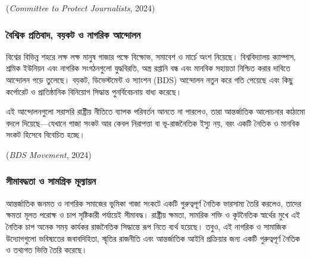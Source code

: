 (\emph{Committee to Protect Journalists}, 2024)

\vspace{0.3em}

\subsubsection{বৈশ্বিক প্রতিবাদ, বয়কট ও নাগরিক
আন্দোলন}\label{ux9acux9b6ux9acux995-ux9aaux9b0ux9a4ux9acux9a6-ux9acux9dfux995ux99f-ux993-ux9a8ux997ux9b0ux995-ux986ux9a8ux9a6ux9b2ux9a8}

বিশ্বের বিভিন্ন শহরে লক্ষ লক্ষ মানুষ গাজার পক্ষে বিক্ষোভ, সমাবেশ ও মার্চে অংশ
নিয়েছে। বিশ্ববিদ্যালয় ক্যাম্পাস, শ্রমিক ইউনিয়ন এবং নাগরিক সংগঠনগুলো যুদ্ধবিরতি,
অস্ত্র রপ্তানি বন্ধ এবং মানবিক সহায়তা নিশ্চিত করার দাবিতে আন্দোলন গড়ে তুলেছে।
বয়কট, ডিভেস্টমেন্ট ও স্যাংশন (BDS) আন্দোলন নতুন করে গতি পেয়েছে এবং কিছু
কর্পোরেট ও প্রাতিষ্ঠানিক বিনিয়োগ সিদ্ধান্ত পুনর্বিবেচনায় বাধ্য করেছে।

এই আন্দোলনগুলো সরাসরি রাষ্ট্রীয় নীতিতে ব্যাপক পরিবর্তন আনতে না পারলেও, তারা
আন্তর্জাতিক আলোচনার কাঠামো বদলে দিয়েছে---যেখানে গাজা সংকট আর কেবল নিরাপত্তা
বা ভূ-রাজনৈতিক ইস্যু নয়, বরং একটি নৈতিক ও মানবিক সংকট হিসেবে বিবেচিত হচ্ছে।

(\emph{BDS Movement}, 2024)

\vspace{0.3em}

\subsubsection{সীমাবদ্ধতা ও সামগ্রিক
মূল্যায়ন}\label{ux9b8ux9aeux9acux9a6ux9a7ux9a4-ux993-ux9b8ux9aeux997ux9b0ux995-ux9aeux9b2ux9afux9dfux9a8}

আন্তর্জাতিক জনমত ও নাগরিক সমাজের ভূমিকা গাজা সংকটে একটি গুরুত্বপূর্ণ নৈতিক
ভারসাম্য তৈরি করলেও, তাদের ক্ষমতা মূলত পরোক্ষ ও চাপ সৃষ্টিকারী পর্যায়েই
সীমাবদ্ধ। রাষ্ট্রীয় ক্ষমতা, সামরিক শক্তি ও কূটনৈতিক স্বার্থের মুখে এই নৈতিক চাপ
অনেক সময় কার্যকর রাজনৈতিক সিদ্ধান্তে রূপ নিতে ব্যর্থ হয়েছে। তবুও, এই নাগরিক ও
সামাজিক উদ্যোগগুলো ভবিষ্যতের জবাবদিহিতা, স্মৃতির রাজনীতি এবং আন্তর্জাতিক আইনি
প্রক্রিয়ার জন্য একটি গুরুত্বপূর্ণ নৈতিক ও তথ্যগত ভিত্তি তৈরি করেছে।

